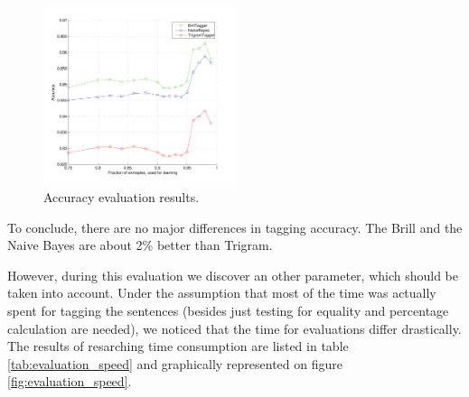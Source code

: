 \documentclass[10pt, conference, compsocconf]{IEEEtran}
\begin{document}
\begin{figure}[htb]
\begin{center}
\includegraphics[width=0.5\textwidth]{../evaluation/graph.pdf} 
\end{center}
\caption{Accuracy evaluation results.}
\label{fig:evaluation}
\end{figure}
\par
To conclude, there are no major differences in tagging accuracy. The Brill and the Naive Bayes are about 2\% better than Trigram.
\par
However, during this evaluation we discover an other parameter, which should be taken into account.
Under the assumption that most of the time was actually spent for tagging the sentences (besides just testing for equality and percentage calculation are needed), we noticed that the time for evaluations differ drastically.
The results of resarching time consumption are listed in table \ref{tab:evaluation_speed} and graphically represented on figure \ref{fig:evaluation_speed}.
\end{document}
